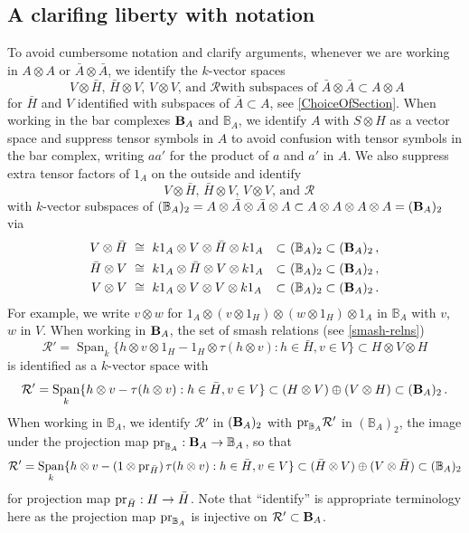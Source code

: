 \documentclass[11pt]{amsart}
\numberwithin{equation}{section}
\DeclareMathOperator{\Span}{Span}
\newcommand{\pr}{ {\rm{pr}} }%
\newcommand{\R}{\mathcal{R}}
\newcommand{\B}{{\bf B}} %
\newcommand{\BB}{\mathbb{B}} %
\renewcommand{\_}[1]{\mbox{$_{\left( #1 \right)}$}}
\newcommand{\ot}{\otimes}
\newcommand{\Ho}{H}%
\begin{document}
{\subsection*{A clarifing liberty with notation}
To avoid cumbersome notation and
clarify arguments,
whenever we are
working in $A\ot A$ or $\bar A \ot \bar A$,
we identify the $k$-vector spaces
\begin{equation}\label{liberty1}
  \text{
  $V\ot \bar H$, \ $\bar H \ot V$, \ $V\ot V$, and $\R$
    with 
  subspaces of $\bar A \ot \bar A \subset A\ot A$}
\end{equation}
for 
$\bar H$ and $V$ identified with 
subspaces of $\bar A\subset A$, see \cref{ChoiceOfSection}.
When working in the bar complexes $\B_A$ and $\BB_A$,
we  identify $A$ with $S\ot H$ as a vector space 
and suppress tensor symbols in $A$  to avoid confusion 
with tensor symbols in the bar complex, writing 
$aa'$ for the product of $a$ and $a'$ in $A$. 
We also suppress extra tensor factors of $1_A$ on the outside
and identify
\begin{equation*} 
 \text{ 
   $V\ot \bar H$, \ $\bar H \ot V$, \ $V\ot V$, and $\R$}
\end{equation*}
    with 
    $k$-vector subspaces of
    $(\BB_A)_2 = A\ot \bar A \ot \bar A \ot A
  \subset A\ot A \ot A \ot A = (\B_A)_2$
via 
\begin{equation}\label{liberty2}
  \begin{aligned}
V\ot \bar H \ &\cong\ k1_A \ot V \ot \bar H \ot
k1_A 
&\subset\ &(\BB_A)_2 \subset (\B_A)_2\, ,
\\
\bar H\ot V \ &\cong\  k1_A \ot \bar H \ot V \ot k1_A 
&\subset\ &(\BB_A)_2 \subset (\B_A)_2\, ,
\\
V\ot V \ &\cong\ k1_A \ot V \ot V \ot k1_A 
&\subset\ &(\BB_A)_2  \subset (\B_A)_2
\, .
\end{aligned}
\end{equation}
For example, we write $v\ot w$ for $1_A\ot (v\ot 1_H)\ot (w\ot
1_H)\ot 1_A$ in $\BB_A$ with $v$, $w$ in $V$.
When working in $\B_A$, the set of smash relations (see
\cref{smash-relns})
\begin{equation*}
   \R' = \Span_k \{ h\ot v\ot 1_H - 1_H\ot \tau(h\ot v)  : 
   h\in \bar H, v\in V  \} \subset \Ho\ot V\ot \Ho 
 \end{equation*}
is identified as a $k$-vector space with 
 \begin{equation}\label{liberty3}
   \R' = \Span_k \{ h\ot v - \tau(h\ot v)  : 
   h\in \bar H, v\in V  \} \subset (H\ot V)\oplus (V\ot H) 
  \subset (\B_A)_2 
   \, . 
 \end{equation}
 When working in $\BB_A$,
 we identify $\R'$ in $(\B_A)_2$
 with $\pr_{\BB_A} \R'$ in $(\BB_A)_2$, the image under the projection map
 $\pr_{\BB_A}:\B_A\rightarrow \BB_A$,
 so that
 \begin{equation}\label{liberty4}
   \R' = \Span_k \{ h\ot v- (1\ot \pr_{\bar H})\, \tau(h\ot v)  : 
   h\in \bar{\Ho}, v\in V  \} \subset (\bar H\ot V)\oplus (V\ot \bar
   H)   \subset (\BB_A)_2
 \end{equation}
 for projection map $\pr_{\bar H}: H\rightarrow \bar H$.
 Note that ``identify'' is appropriate terminology here
 as the projection map $\pr_{\BB_A}$ is injective on $\R'\subset \B_A$.
 
}
\end{document}
